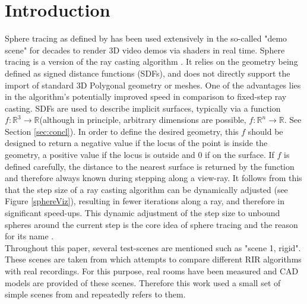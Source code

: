 \documentclass[twoside,a4paper]{article}
\begin{document}
\section{Introduction}
\label{sec:intro}
Sphere tracing as defined by \cite{hart_sphere_1996} has been used extensively in the so-called "demo scene" for decades to render 3D video demos via shaders in real time. 
Sphere tracing is a version of the ray casting algorithm \cite{roth_ray_1982}. It relies on the geometry being defined as signed distance functions (SDFs), and does not directly support the import of standard 3D Polygonal geometry or meshes. One of the advantages lies in the algorithm's potentially improved speed in comparison to fixed-step ray casting. SDFs are used to describe implicit surfaces, typically via a function $f : \mathbb{R}^3 \rightarrow \mathbb{R}$(although in principle, arbitrary dimensions are possible, $f : \mathbb{R}^n \rightarrow \mathbb{R}$. See Section \ref{sec:concl}). In order to define the desired geometry, this $f$ should be designed to return a negative value if the locus of the point is inside the geometry, a positive value if the locus is outside and 0 if on the surface. 
If $f$ is defined carefully, the distance to the nearest surface is returned by the function and therefore always known during stepping along a view-ray. 
It follows from this that the step size of a ray casting algorithm can be dynamically adjusted (see Figure \ref{sphereViz}), resulting in fewer iterations along a ray, and therefore in significant speed-ups. This dynamic adjustment of the step size to unbound spheres around the current step is the core idea of sphere tracing and the reason for its name \cite{hart_sphere_1996}. \\
Throughout this paper, several test-scenes are mentioned such as "scene 1, rigid". These scenes are taken from \cite{brinkmann_round_2019} which attempts to compare different RIR algorithms with real recordings. For this purpose, real rooms have been measured and CAD models are provided of these scenes. Therefore this work used a small set of simple scenes from \cite{brinkmann_round_2019} and repeatedly refers to them.
\end{document}
